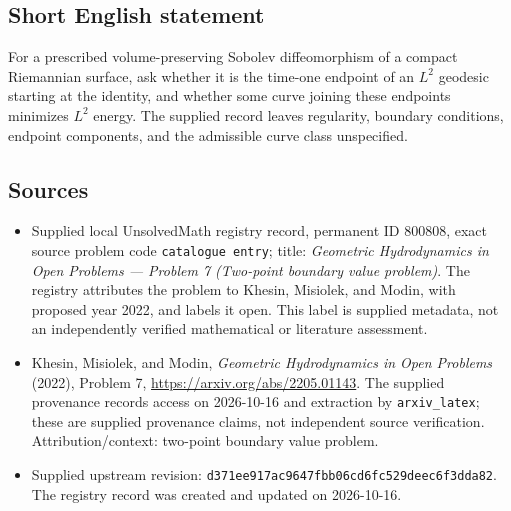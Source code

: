 \documentclass[11pt]{article}
\begin{document}
\subsection{Short English statement}
For a prescribed volume-preserving Sobolev diffeomorphism of a compact Riemannian surface, ask whether it is the time-one endpoint of an \(L^2\) geodesic starting at the identity, and whether some curve joining these endpoints minimizes \(L^2\) energy. The supplied record leaves regularity, boundary conditions, endpoint components, and the admissible curve class unspecified.
\subsection{Sources}
\begin{itemize}
\item Supplied local UnsolvedMath registry record, permanent ID \(800808\), exact source problem code \texttt{catalogue entry}; title: \emph{Geometric Hydrodynamics in Open Problems --- Problem 7 (Two-point boundary value problem)}. The registry attributes the problem to Khesin, Misiolek, and Modin, with proposed year 2022, and labels it open. This label is supplied metadata, not an independently verified mathematical or literature assessment.
\item Khesin, Misiolek, and Modin, \emph{Geometric Hydrodynamics in Open Problems} (2022), Problem 7, \url{https://arxiv.org/abs/2205.01143}. The supplied provenance records access on 2026-10-16 and extraction by \texttt{arxiv\_latex}; these are supplied provenance claims, not independent source verification. Attribution/context: two-point boundary value problem.
\item Supplied upstream revision: \texttt{d371ee917ac9647fbb06cd6fc529deec6f3dda82}. The registry record was created and updated on 2026-10-16.
\end{itemize}
\end{document}

